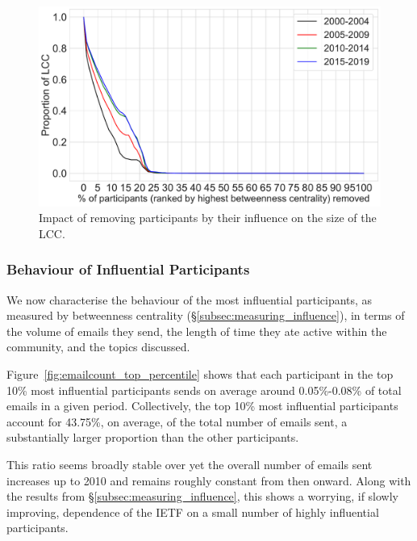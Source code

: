 \documentclass[twocolumn,10pt]{article}
\newlength{\figureWidthOneColumn}
\newcommand{\pb}[1]{\vspace{0.75ex}\noindent{\textbf{#1}}}
\begin{document}
\begin{figure}
  \centering
  \includegraphics[width=\figureWidthOneColumn]{figures-prev/icwsm-2022/lcc_proportion_granular_yearly.pdf}
  \caption{
    Impact of removing participants by their influence on the size
    of the LCC.
  }
  \label{fig:purge_nodes_largest_connected_component_number_components}
\end{figure}

\subsubsection{Behaviour of Influential Participants}
\label{subsec:influencer_behaviour}


We now characterise the behaviour of the most influential participants, as
measured by betweenness centrality (\S\ref{subsec:measuring_influence}), in
terms of the volume of emails they send, the length of time they ate active
within the community, and the topics discussed. 

\pb{Email volume:}
Figure~\ref{fig:emailcount_top_percentile} shows that each participant in
the top 10\% most influential participants sends on average around
0.05\%-0.08\% of total emails in a given period.  Collectively, the top
10\% most influential participants account for 43.75\%, on average, of the
total number of emails sent, a substantially larger proportion than the
other participants.

This ratio seems broadly stable over yet the overall number of emails sent
increases up to 2010 and remains roughly constant from then onward.  Along
with the results from \S\ref{subsec:measuring_influence}, this shows a
worrying, if slowly improving, dependence of the IETF on a small number of
highly influential participants.
\end{document}
